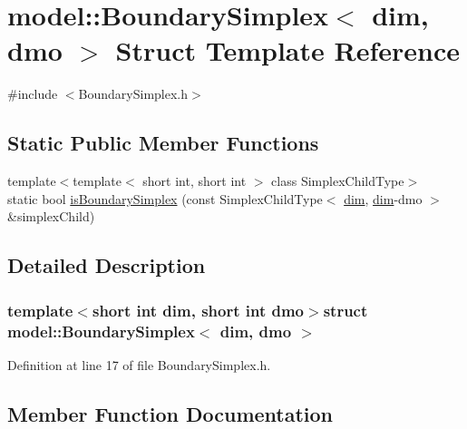 \hypertarget{structmodel_1_1_boundary_simplex}{}\section{model\+:\+:Boundary\+Simplex$<$ dim, dmo $>$ Struct Template Reference}
\label{structmodel_1_1_boundary_simplex}


{\ttfamily \#include $<$Boundary\+Simplex.\+h$>$}

\subsection*{Static Public Member Functions}
\begin{DoxyCompactItemize}
\item 
{\footnotesize template$<$template$<$ short int, short int $>$ class Simplex\+Child\+Type$>$ }\\static bool \hyperlink{structmodel_1_1_boundary_simplex_a8d74c9bee4cfd263579a6d92fc7a36c5}{is\+Boundary\+Simplex} (const Simplex\+Child\+Type$<$ \hyperlink{plot_nd_a_8m_a382f3ca768b275b8d563604f7fc7df73}{dim}, \hyperlink{plot_nd_a_8m_a382f3ca768b275b8d563604f7fc7df73}{dim}-\/dmo $>$ \&simplex\+Child)
\end{DoxyCompactItemize}


\subsection{Detailed Description}
\subsubsection*{template$<$short int dim, short int dmo$>$struct model\+::\+Boundary\+Simplex$<$ dim, dmo $>$}



Definition at line 17 of file Boundary\+Simplex.\+h.



\subsection{Member Function Documentation}
\hypertarget{structmodel_1_1_boundary_simplex_a8d74c9bee4cfd263579a6d92fc7a36c5}{}
